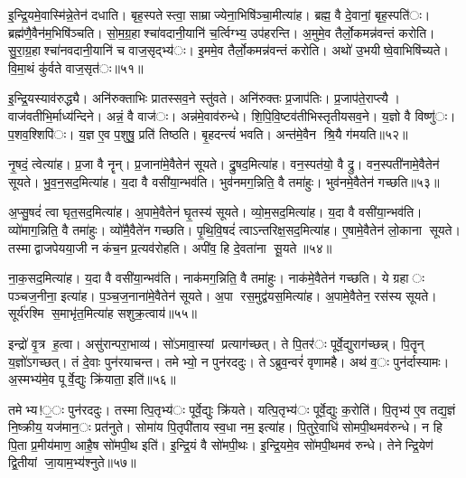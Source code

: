 इ॒न्द्रि॒यमे॒वास्मि॑न्ने॒तेन॑ दधाति। बृह॒स्पतेस्त्वा॒ साम्राज्येना॒भिषि॑ञ्चा॒मीत्या॑ह। ब्रह्म॒ वै दे॒वानां॒ बृह॒स्पति॑ः। ब्रह्म॑णै॒वैन॑म॒भिषि॑ञ्चति। सो॒म॒ग्र॒हाश्चा॑वदानी॒यानि॑ च॒र्त्विग्भ्य॒ उप॑हरन्ति। अ॒मुमे॒व तैर्लो॒कमन्न॑वन्तं करोति। सु॒रा॒ग्र॒हाश्चा॑नवदानी॒यानि॑ च वाज॒सृद्भ्य॑ः। इ॒ममे॒व तैर्लो॒कमन्न॑वन्तं करोति। अथो॑ उ॒भयीष्वे॒वाभिषि॑च्यते। वि॒मा॒थं कु॑र्वते वाज॒सृत॑ः॥५१॥

इ॒न्द्रि॒यस्याव॑रुद्ध्यै। अनि॑रुक्ताभिः प्रातस्सव॒ने स्तु॑वते। अनि॑रुक्तः प्र॒जाप॑तिः। प्र॒जाप॑ते॒राप्त्यै। वाज॑वतीभि॒र्माध्य॑न्दिने। अन्नं॒ वै वाज॑ः। अन्न॑मे॒वाव॑रुन्धे। शि॒पि॒वि॒ष्टव॑तीभिस्तृतीयसव॒ने। य॒ज्ञो वै विष्णु॑ः। प॒शव॒श्शिपि॑ः। य॒ज्ञ ए॒व प॒शुषु॒ प्रति॑ तिष्ठति। बृ॒हदन्त्यं॑ भवति। अन्त॑मे॒वैन श्रि॒यै ग॑मयति॥५२॥


नृ॒षदं॒ त्वेत्या॑ह। प्र॒जा वै नॄन्। प्र॒जाना॑मे॒वैतेन॑ सूयते। द्रु॒षद॒मित्या॑ह। वन॒स्पत॑यो॒ वै द्रु। वन॒स्पती॑नामे॒वैतेन॑ सूयते। भु॒व॒न॒सद॒मित्या॑ह। य॒दा वै वसी॑या॒न्भव॑ति। भुव॑नमग॒न्निति॒ वै तमा॑हुः। भुव॑नमे॒वैतेन॑ गच्छति॥५३॥

अ॒प्सु॒षदं॑ त्वा घृत॒सद॒मित्या॑ह। अ॒पामे॒वैतेन॑ घृ॒तस्य॑ सूयते। व्यो॒म॒सद॒मित्या॑ह। य॒दा वै वसी॑या॒न्भव॑ति। व्यो॑माग॒न्निति॒ वै तमा॑हुः। व्यो॑मै॒वैते॑न गच्छति। पृ॒थि॒वि॒षदं॑ त्वाऽन्तरिक्ष॒सद॒मित्या॑ह। ए॒षामे॒वैतेन॑ लो॒काना सूयते। तस्माद्वाजपेयया॒जी न कंच॒न प्र॒त्यव॑रोहति। अपी॑व॒ हि दे॒वता॑ना सू॒यते॥५४॥

ना॒क॒सद॒मित्या॑ह। य॒दा वै वसी॑या॒न्भव॑ति। नाक॑मग॒न्निति॒ वै तमा॑हुः। नाक॑मे॒वैतेन॑ गच्छति। ये ग्रहाः पञ्चज॒नीना॒ इत्या॑ह। प॒ञ्च॒ज॒नाना॑मे॒वैतेन॑ सूयते। अ॒पा रस॒मुद्व॑यस॒मित्या॑ह। अ॒पामे॒वैतेन॒ रस॑स्य सूयते। सूर्य॑रश्मि स॒माभृ॑त॒मित्या॑ह सशुक्र॒त्वाय॑॥५५॥


इन्द्रो॑ वृ॒त्र ह॒त्वा। असु॑रान्परा॒भाव्य॑। सो॑ऽमावा॒स्यां प्रत्याग॑च्छत्। ते पि॒तर॑ः पूर्वे॒द्युराग॑च्छन्न्। पि॒तॄन् य॒ज्ञो॑ऽगच्छत्। तं दे॒वाः पुन॑रयाचन्त। तमेभ्यो॒ न पुन॑रददुः। तेऽब्रुव॒न्वरं॑ वृणामहै। अथ॑ व॒ः पुन॑र्दास्यामः। अ॒स्मभ्य॑मे॒व पूर्वे॒द्युः क्रि॑याता॒ इति॑॥५६॥

तमेभ्य!॒ः पुन॑रददुः। तस्मात्पि॒तृभ्य॑ः पूर्वे॒द्युः क्रि॑यते। यत्पि॒तृभ्य॑ः पूर्वे॒द्युः क॒रोति॑। पि॒तृभ्य॑ ए॒व तद्य॒ज्ञं नि॒ष्क्रीय॒ यज॑मान॒ः प्रत॑नुते। सोमा॑य पि॒तृपी॑ताय स्व॒धा नम॒ इत्या॑ह। पि॒तुरे॒वाधि॑ सोमपी॒थमव॑रुन्धे। न हि पि॒ता प्र॒मीय॑माण॒ आहै॒ष सो॑मपी॒थ इति॑। इ॒न्द्रि॒यं वै सो॑मपी॒थः। इ॒न्द्रि॒यमे॒व सो॑मपी॒थमव॑ रुन्धे। तेनेन्द्रि॒येण॑ द्वि॒तीयां जा॒याम॒भ्य॑श्नुते॥५७॥

